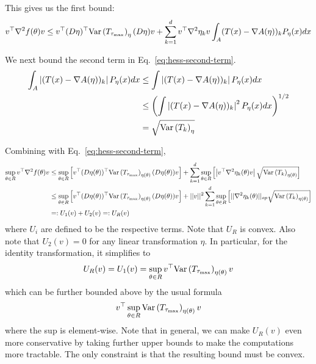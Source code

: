 \documentclass[10pt]{article}
\begin{document}
This gives us the first bound:
\begin{align}
    v^\top \nabla^2 f(\theta) v
    \leq
    v^\top (D\eta)^\top \text{Var}\left(T_{\tau_{\max}}\right)_{\eta} (D\eta) v
    +
    \sum\limits_{k=1}^d 
    v^\top \nabla^2 \eta_k v
    \int_A (T(x) - \nabla A(\eta))_k P_\eta(x) dx
    \label{eq:hess-second-term}
\end{align}

We next bound the second term in Eq.~\ref{eq:hess-second-term}.
\begin{align*}
    \int_A \left\lvert(T(x) - \nabla A(\eta))_k\right\rvert P_\eta(x) dx
    &\leq
    \int \left\lvert(T(x) - \nabla A(\eta))_k\right\rvert P_\eta(x) dx
    \\&\leq
    \left(\int \left\lvert(T(x) - \nabla A(\eta))_k\right\rvert^2 P_\eta(x) dx\right)^{1/2}
    \\&=
    \sqrt{\text{Var}\left(T_k\right)_\eta}
\end{align*}

Combining with Eq.~\ref{eq:hess-second-term},
\begin{align*}
    \sup\limits_{\theta \in R} 
    v^\top \nabla^2 f(\theta) v
    &\leq
    \sup\limits_{\theta \in R} 
    \bracket{
        v^\top (D\eta(\theta))^\top \var{T_{\tau_{\max}}}_{\eta(\theta)} (D\eta(\theta)) v
    }
    +
    \sum\limits_{k=1}^d 
    \sup\limits_{\theta \in R}
    \bracket{%
        \abs{v^\top \nabla^2 \eta_k(\theta) v}
        \sqrt{\var{T_k}_{\eta(\theta)}}
    }
    \\&\leq
    \sup\limits_{\theta \in R} 
    \bracket{
        v^\top (D\eta(\theta))^\top \var{T_{\tau_{\max}}}_{\eta(\theta)} (D\eta(\theta)) v
    }
    +
    \norm{v}^2
    \sum\limits_{k=1}^d 
    \sup\limits_{\theta \in R}
    \bracket{%
        \norm{\nabla^2 \eta_k(\theta)}_{op}
        \sqrt{\var{T_k}_{\eta(\theta)}}
    }
    \\&=: 
    U_1(v) + U_2(v)
    =:
    U_R(v)
\end{align*}
where $U_i$ are defined to be the respective terms.
Note that $U_R$ is convex.
Also note that $U_2(v) = 0$ for any linear transformation $\eta$.
In particular, for the identity transformation, it simplifies to 
\begin{align*}
    U_R(v) = U_1(v) = \sup\limits_{\theta \in R} v^\top \text{Var}\left(T_{\tau_{\max}}\right)_{\eta(\theta)} v
\end{align*}
which can be further bounded above by the usual formula
\begin{align*}
    v^\top \sup\limits_{\theta \in R} \text{Var}\left(T_{\tau_{\max}}\right)_{\eta(\theta)} v
\end{align*}
where the sup is element-wise.
Note that in general, we can make $U_R(v)$ even more conservative
by taking further upper bounds to make the computations more tractable.
The only constraint is that the resulting bound must be convex.


{}

\end{document}
